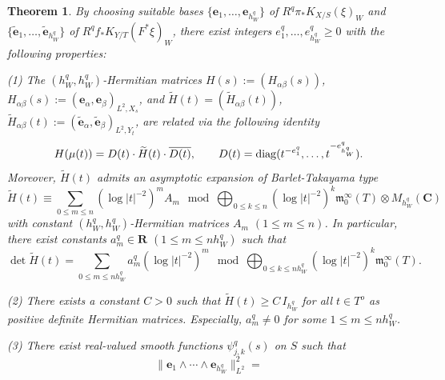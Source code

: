 \documentclass[amscd, leqno]{amsart}
\theoremstyle{plain}
\newtheorem{theorem}{Theorem}[section]
\theoremstyle{definition}
\theoremstyle{remark}
\begin{document}
\begin{theorem}
\label{thm:str:sing:L2}
By choosing suitable bases $\{ {\mathbf e}_{1},\ldots,{\mathbf e}_{h_{W}^{q}} \}$ of $R^{q}\pi_{*}K_{X/S}(\xi)_{W}$ and 
$\{ \widetilde{\mathbf e}_{1}, \ldots, \widetilde{\mathbf e}_{h_{W}^{q}}\}$ of $R^{q}f_{*}K_{Y/T}(F^{*}\xi)_{W}$,
there exist integers $e^{q}_{1},\ldots, e^{q}_{h_{W}^{q}} \geq0$ with the following properties:
\par{\rm (1) }
The $(h_{W}^{q}, h_{W}^{q})$-Hermitian matrices $H(s) := ( H_{\alpha\beta}(s) )$, 
$H_{\alpha\beta}(s) := ( {\mathbf e}_{\alpha} , {\mathbf e}_{\beta} )_{L^{2},X_{s}}$, and
$\widetilde{H}(t) = ( \widetilde{H}_{\alpha\beta}(t) )$, 
$\widetilde{H}_{\alpha\beta}(t) := ( \widetilde{\mathbf e}_{\alpha} , \widetilde{\mathbf e}_{\beta} )_{L^{2},Y_{t}}$, 
are related via the following identity
\begin{equation}
\label{eqn:decomp:H}
H(\mu(t)) = D(t)\cdot \widetilde{H}(t)\cdot\overline{D(t)},
\qquad
D(t) = {\rm diag}( t^{-e^{q}_{1}},\ldots,t^{-e^{q}_{h_{W}^{q}}} ).
\end{equation}
Moreover, $\widetilde{H}(t)$ admits an asymptotic expansion of Barlet-Takayama type
\begin{equation}
\label{eqn:asym:exp:H:2}
\widetilde{H}(t) \equiv \sum_{0\leq m \leq n} (\log |t|^{-2})^{m} A_{m} 
\mod \bigoplus_{0\leq k \leq n} (\log |t|^{-2})^{k} {\mathfrak m}^{\infty}_{0}(T) \otimes M_{h_{W}^{q}}( {\mathbf C} )
\end{equation}
with constant $(h_{W}^{q}, h_{W}^{q})$-Hermitian matrices $A_{m}$ $(1\leq m \leq n)$. 
In particular, there exist constants $a_{m}^{q} \in {\mathbf R}$ $( 1 \leq m \leq n h_{W}^{q})$ such that 
\begin{equation}
\label{eqn:asym:exp:det:H:2}
\det \widetilde{H}(t) = \sum_{0 \leq m \leq n h_{W}^{q}} a_{m}^{q} (\log |t|^{-2})^{m} 
\mod \bigoplus_{0\leq k \leq n h_{W}^{q}} (\log |t|^{-2})^{k} {\mathfrak m}^{\infty}_{0}(T).
\end{equation}
\par{\rm (2) }
There exists a constant $C>0$ such that $\widetilde{H}(t) \geq C\,I_{h_{W}^{q}}$ for all $t\in T^{o}$ as positive definite Hermitian matrices.
Especially, $a_{m}^{q} \not=0$ for some $1 \leq m \leq n h_{W}^{q}$.
\par{\rm (3) }
There exist real-valued smooth functions $\psi_{j,k}^{q}(s)$ on $S$ such that
\begin{equation}
\label{eqn:L2:asym:eqv}
\| {\mathbf e}_{1}\wedge \cdots\wedge {\mathbf e}_{h_{W}^{q}} \|_{L^{2}}^{2} =

\end{equation}
\end{theorem}
\end{document}
